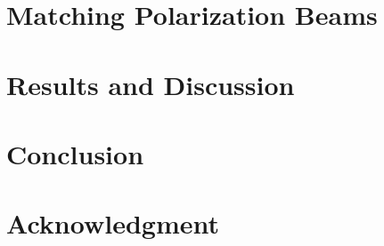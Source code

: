 \documentclass[twocolumn,apj,numberedappendix]{emulateapj}
\begin{document}
\section{Matching Polarization Beams}
\label{sec:polbeams}

\section{Results and Discussion}
\label{sec:results}

\section{Conclusion}
\label{sec:conclusion}

\section{Acknowledgment}

\end{document}
